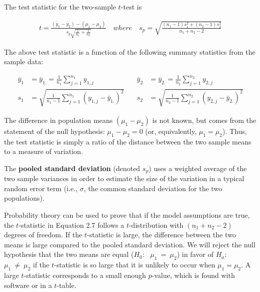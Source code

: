 \documentclass[
]{report}
\begin{document}
The test statistic for the two-sample \(\scriptstyle t\)-test is

\begin{align} 
\label{2.7}
t = \frac{(\bar{y}_1 - \bar{y}_2) - (\mu_1 - \mu_2)}{s_p\sqrt{\frac{1}{n_1} + \frac{1}{n_2}}} 
\quad where \quad
s_p = \sqrt{\frac{(n_1-1)s_1^2 + (n_2-1)s_2^2}{n_1 + n_2 - 2}}
\tag{2.7}
\end{align}

The above test statistic is a function of the following summary statistics from the sample data:

\begin{align*}
\bar{y}_1 &= \bar{y}_{1.} = \frac{1}{n_1}\sum_{j=1}^{n_1}y_{1,j} 
& \quad 
\bar{y}_2 &= \bar{y}_{2.} = \frac{1}{n_2}\sum_{j=1}^{n_2}y_{2,j} \\
s_1 &= \sqrt{\frac{1}{n_1 - 1}\sum_{j=1}^{n_1}(y_{1,j} - \bar{y}_{1.})^2} 
& \quad 
s_2 &= \sqrt{\frac{1}{n_2 - 1}\sum_{j=1}^{n_2}(y_{2,j} - \bar{y}_{2.})^2}
\end{align*}

The difference in population means \(\scriptstyle (\mu_1 - \mu_2)\) is not known, but comes from the statement of the null hypothesis: \(\scriptstyle \mu_1 - \mu_2 = 0\) (or, equivalently, \(\scriptstyle \mu_1 = \mu_2\)). Thus, the test statistic is simply a ratio of the distance between the two sample means to a measure of variation.

The \textbf{pooled standard deviation} (denoted \(\scriptstyle s_p\)) uses a weighted average of the two sample variances in order to estimate the size of the variation in a typical random error term (i.e., \(\scriptstyle \sigma\), the common standard deviation for the two populations).

Probability theory can be used to prove that if the model assumptions are true, the \(\scriptstyle t\)-statistic in Equation 2.7 follows a \(\scriptstyle t\)-distribution with \(\scriptstyle (n_1 + n_2 - 2)\) degrees of freedom. If the \(\scriptstyle t\)-statistic is large, the difference between the two means is large compared to the pooled standard deviation. We will reject the null hypothesis that the two means are equal (\(\scriptstyle H_0\):~ \(\mu_1 \ =\  \mu_2\)) in favor of \(\scriptstyle H_a\):~ \(\mu_1 \ \ne\  \mu_2\) if the \(\scriptstyle t\)-statistic is so large that it is unlikely to occur when \(\scriptstyle \mu_1 = \mu_2\). A large \(\scriptstyle t\)-statistic corresponds to a small enough \(\scriptstyle p\)-value, which is found with software or in a \(\scriptstyle t\)-table.
\end{document}
